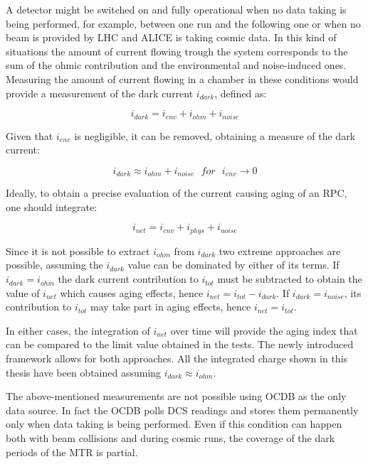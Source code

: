 A detector might be switched on and fully operational when no data taking is being performed, for example, between one run and the following one or when no beam is provided by LHC and ALICE is taking cosmic data.
In this kind of situations the amount of current flowing trough the system corresponds to the sum of the ohmic contribution and the environmental and noise-induced ones.
Measuring the amount of current flowing in a chamber in these conditions would provide a measurement of the dark current $i_{dark}$, defined as:

\begin{equation}
\label{eq:idark1}
i_{dark}=i_{env}+i_{ohm}+i_{noise}
\end{equation}

Given that $i_{env}$ is negligible, it can be removed, obtaining a measure of the dark current:

\begin{equation}
\label{eq:idark}
i_{dark}\approx i_{ohm}+i_{noise}\ \ \ for\ \ \ i_{env}\rightarrow0
\end{equation}

Ideally, to obtain a precise evaluation of the current causing aging of an RPC, one should integrate:

\begin{equation}
\label{eq:inet}
i_{net}=i_{env}+i_{phys}+i_{noise}
\end{equation}

Since it is not possible to extract $i_{ohm}$ from $i_{dark}$ two extreme approaches are possible, assuming the $i_{dark}$ value can be dominated by either of its terms.
If $i_{dark}=i_{ohm}$ the dark current contribution to $i_{tot}$ must be subtracted to obtain the value of $i_{net}$ which causes aging effects, hence $i_{net}=i_{tot}-i_{dark}$.
If $i_{dark}=i_{noise}$, its contribution to $i_{tot}$ may take part in aging effects, hence $i_{net}=i_{tot}$.

In either cases, the integration of $i_{net}$ over time will provide the aging index that can be compared to the limit value obtained in the tests.
The newly introduced framework allows for both approaches.
All the integrated charge shown in this thesis have been obtained assuming $i_{dark}\approx i_{ohm}$.

The above-mentioned measurements are not possible using OCDB as the only data source.
In fact the OCDB polls DCS readings and stores them permanently only when data taking is being performed.
Even if this condition can happen both with beam collisions and during cosmic runs, the coverage of the dark periods of the MTR is partial.

